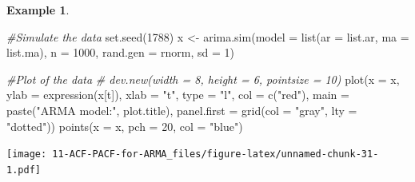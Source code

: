 \documentclass[
]{book}
\newenvironment{Shaded}{\begin{snugshade}}{\end{snugshade}}
\newcommand{\AttributeTok}[1]{\textcolor[rgb]{0.77,0.63,0.00}{#1}}
\newcommand{\CommentTok}[1]{\textcolor[rgb]{0.56,0.35,0.01}{\textit{#1}}}
\newcommand{\DecValTok}[1]{\textcolor[rgb]{0.00,0.00,0.81}{#1}}
\newcommand{\FunctionTok}[1]{\textcolor[rgb]{0.00,0.00,0.00}{#1}}
\newcommand{\NormalTok}[1]{#1}
\newcommand{\OtherTok}[1]{\textcolor[rgb]{0.56,0.35,0.01}{#1}}
\newcommand{\StringTok}[1]{\textcolor[rgb]{0.31,0.60,0.02}{#1}}
\theoremstyle{definition}
\theoremstyle{definition}
\newtheorem{example}{Example}[chapter]
\theoremstyle{definition}
\theoremstyle{definition}
\theoremstyle{remark}
\begin{document}
\begin{example}
\begin{Shaded}
\begin{Highlighting}[]
\CommentTok{\#Simulate the data}
  \FunctionTok{set.seed}\NormalTok{(}\DecValTok{1788}\NormalTok{)}
\NormalTok{  x }\OtherTok{\textless{}{-}} \FunctionTok{arima.sim}\NormalTok{(}\AttributeTok{model =} \FunctionTok{list}\NormalTok{(}\AttributeTok{ar =}\NormalTok{ list.ar, }\AttributeTok{ma =}\NormalTok{ list.ma), }\AttributeTok{n =} \DecValTok{1000}\NormalTok{,}
    \AttributeTok{rand.gen =}\NormalTok{ rnorm, }\AttributeTok{sd =} \DecValTok{1}\NormalTok{)}
  
  
  \CommentTok{\#Plot of the data}
  \CommentTok{\# dev.new(width = 8, height = 6, pointsize = 10)}
  \FunctionTok{plot}\NormalTok{(}\AttributeTok{x =}\NormalTok{ x, }\AttributeTok{ylab =} \FunctionTok{expression}\NormalTok{(x[t]), }\AttributeTok{xlab =} \StringTok{"t"}\NormalTok{, }\AttributeTok{type =} \StringTok{"l"}\NormalTok{, }\AttributeTok{col =} \FunctionTok{c}\NormalTok{(}\StringTok{"red"}\NormalTok{),  }
    \AttributeTok{main =}  \FunctionTok{paste}\NormalTok{(}\StringTok{"ARMA model:"}\NormalTok{, plot.title),}
    \AttributeTok{panel.first =} \FunctionTok{grid}\NormalTok{(}\AttributeTok{col =} \StringTok{"gray"}\NormalTok{, }\AttributeTok{lty =} \StringTok{"dotted"}\NormalTok{))}
  \FunctionTok{points}\NormalTok{(}\AttributeTok{x =}\NormalTok{ x, }\AttributeTok{pch =} \DecValTok{20}\NormalTok{, }\AttributeTok{col =} \StringTok{"blue"}\NormalTok{)}
\end{Highlighting}
\end{Shaded}

\texttt{[image: 11-ACF-PACF-for-ARMA\_files/figure-latex/unnamed-chunk-31-1.pdf]}


\end{example}
\end{document}
